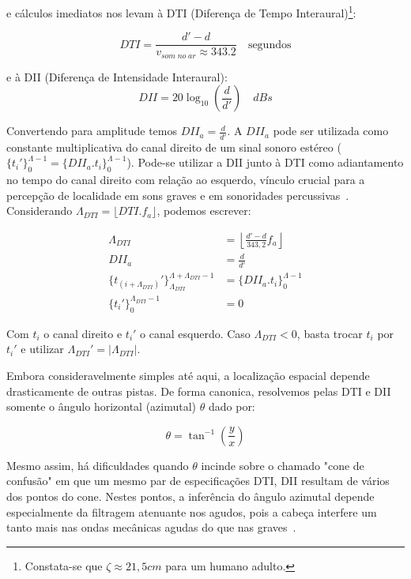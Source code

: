 e cálculos imediatos nos levam à DTI (Diferença de Tempo Interaural)\footnote{Constata-se que $\zeta \approx 21,5cm$ para um humano adulto.}:

\begin{equation}
DTI=\frac{d'-d}{v_{som\;no\;ar}\approx 343.2 }\quad \text{segundos}
\end{equation}

e à DII (Diferença de Intensidade Interaural):
\begin{equation}
DII=20\log_{10}\left (\frac{d}{d'}\right) \quad dBs
\end{equation}

Convertendo para amplitude temos $DII_a=\frac{d}{d'}$. A $DII_a$ pode
ser utilizada como constante multiplicativa do canal direito de um sinal sonoro estéreo ($\{t_i'\}_0^{\Lambda -1}=\{DII_a . t_i\}_0^{\Lambda -1}$). Pode-se utilizar a DII junto à DTI como adiantamento no tempo do canal direito com relação ao esquerdo, vínculo crucial para a percepção de localidade em sons graves e em sonoridades percussivas~\cite{Heeger}.
Considerando $\Lambda_{DTI}=\lfloor DTI . f_a \rfloor $, podemos escrever:

\begin{equation}
\begin{split}
\Lambda_{DTI} & = \left \lfloor \frac{d'-d}{343,2}  f_a \right \rfloor \\
DII_a & = \frac{d}{d'} \\
\{t_{(i+\Lambda_{DTI})}'\}_{\Lambda_{DTI}}^{\Lambda+\Lambda_{DTI}-1} & =\{DII_a . t_i\}_0^{\Lambda-1} \\
\{t_i'\}_0^{\Lambda_{DTI}-1} & = 0
\end{split}
\end{equation}

Com $t_i$ o canal direito e $t_i'$ o canal esquerdo. Caso $\Lambda_{DTI} < 0 $, basta trocar $t_i$ por $t_i'$  e utilizar $\Lambda_{DTI}'= | \Lambda_{DTI} | $.

Embora consideravelmente simples até aqui, a localização espacial depende drasticamente de outras pistas. De forma canonica, resolvemos pelas
DTI e DII somente o ângulo horizontal (azimutal) $\theta$ dado por:

\begin{equation}
\theta=\tan^{-1}\left ( \frac{y}{ x }  \right )
\end{equation}

Mesmo assim, há dificuldades quando $\theta$ incinde sobre o chamado "cone de confusão" em que um mesmo par de especificações DTI, DII resultam de vários dos pontos 
do cone. Nestes pontos, a inferência do ângulo azimutal depende especialmente da filtragem atenuante nos agudos, pois a cabeça interfere um tanto mais nas ondas mecânicas agudas do que nas graves~\cite{Heeger,hrtf}. 

